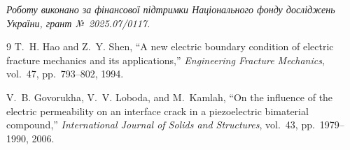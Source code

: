 \textit{Роботу виконано за фінансової підтримки Національного фонду досліджень України, грант №~2025.07/0117.}

\begin{thebibliography}{9}
T.~H. Hao and Z.~Y. Shen,
``A new electric boundary condition of electric fracture mechanics and its applications,''
\emph{Engineering Fracture Mechanics}, vol.~47, pp.~793--802, 1994.

V.~B. Govorukha, V.~V. Loboda, and M.~Kamlah,
``On the influence of the electric permeability on an interface crack in a piezoelectric bimaterial compound,''
\emph{International Journal of Solids and Structures}, vol.~43, pp.~1979--1990, 2006.
\end{thebibliography}
